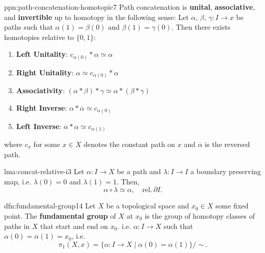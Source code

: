 \documentclass[landscape, 8pt]{extarticle}
\begin{document}
\begin{multicols*}{3}
\vspace{-7pt}
\begin{ppn}{ppn:path-concatenation-homotopic}{7}
	Path concatenation is \textbf{unital}, \textbf{associative}, and \textbf{invertible} up to homotopy in the following sense: Let $\alpha,\, \beta,\, \gamma : I \to x$ be paths such that $\alpha(1) = \beta(0)$ and $\beta(1) = \gamma(0)$. Then there exists homotopies relative to $\{0,1\}$:
	\vspace{-2pt}
	\begin{enumerate}[noitemsep]
	    \item \textbf{Left Unitality}: $c_{\alpha(0)} \ast \alpha \simeq \alpha$
	    \item \textbf{Right Unitality}: $\alpha \simeq c_{\alpha(0)} \ast \alpha $
	    \item \textbf{Associativity}: $(\alpha \ast \beta) \ast \gamma \simeq \alpha \ast (\beta \ast \gamma)$
	    \item \textbf{Right Inverse}: $\alpha \ast \overline{\alpha} \simeq c_{\alpha(0)}$
	    \item \textbf{Left Inverse}: $\overline{\alpha} \ast \alpha \simeq c_{\alpha(1)}$
	\end{enumerate}
	\vspace{-2pt}
	where $c_{x}$ for some $x\in X$ denotes the constant path on $x$ and $\overline{\alpha}$ is the reversed path.
\end{ppn}

\vspace{-7pt}
\begin{lma}[]{lma:concat-relative-i}{3}
	Let $\alpha : I \to X$ be a path and $\lambda : I \to I$ a boundary preserving map, i.e. $\lambda(0) = 0$ and $\lambda(1)=1$. Then,
	\[\alpha \circ \lambda \simeq \alpha, \quad \text{rel.}\, \partial I.\]
\end{lma}

\begin{dfn}{dfn:fundamental-group}{14}
	\vspace{-2pt}
	Let $X$ be a topological space and $x_{0}\in X$ some fixed point. The \textbf{fundamental group} of $X$ at $x_{0}$ is the group of homotopy classes of paths in $X$ that start and end on $x_{0}$. i.e. $\alpha : I \to X$ such that $\alpha(0) = \alpha(1) = x_{0}$, i.e.
	\vspace{-2pt}
	\[\pi_{1}(X, x) = \{\alpha : I \to X \mid \alpha(0) = \alpha(1)\} /\sim.\]
\end{dfn}


\end{multicols*}
\end{document}
